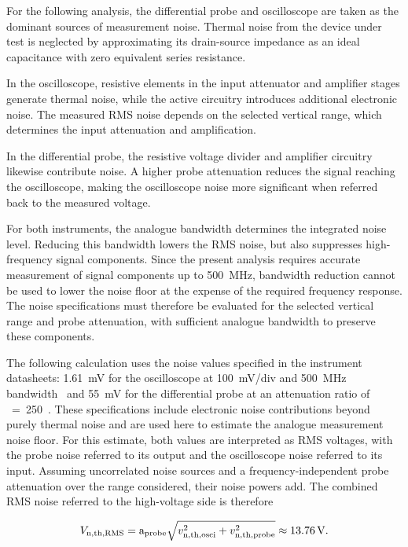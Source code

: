 For the following analysis, the differential probe and oscilloscope are taken as the dominant sources of measurement noise.
Thermal noise from the device under test is neglected by approximating its drain-source impedance as an ideal capacitance with zero equivalent series resistance.

In the oscilloscope, resistive elements in the input attenuator and amplifier stages generate thermal noise, while the active circuitry introduces additional electronic noise.
The measured RMS noise depends on the selected vertical range, which determines the input attenuation and amplification.

In the differential probe, the resistive voltage divider and amplifier circuitry likewise contribute noise.
A higher probe attenuation reduces the signal reaching the oscilloscope, making the oscilloscope noise more significant when referred back to the measured voltage.

For both instruments, the analogue bandwidth determines the integrated noise level.
Reducing this bandwidth lowers the RMS noise, but also suppresses high-frequency signal components.
Since the present analysis requires accurate measurement of signal components up to \SI{500}{MHz}, bandwidth reduction cannot be used to lower the noise floor at the expense of the required frequency response.
The noise specifications must therefore be evaluated for the selected vertical range and probe attenuation, with sufficient analogue bandwidth to preserve these components.

The following calculation uses the noise values specified in the instrument datasheets: \SI{1.61}{mV} for the oscilloscope at \SI{100}{mV/div} and \SI{500}{MHz} bandwidth~\cite{tektronix_mso_2026} and \SI{55}{mV} for the differential probe at an attenuation ratio of ~=~250~\cite{pmk_gmbh_datasheet_2017}.
These specifications include electronic noise contributions beyond purely thermal noise and are used here to estimate the analogue measurement noise floor.
For this estimate, both values are interpreted as RMS voltages, with the probe noise referred to its output and the oscilloscope noise referred to its input.
Assuming uncorrelated noise sources and a frequency-independent probe attenuation over the range considered, their noise powers add.
The combined RMS noise referred to the high-voltage side is therefore

\begin{equation}
	{V}_{\mathrm{n,th,RMS}} = \text{a}_{\text{probe}}\sqrt{{v}_{\mathrm{n,th,osci}}^2 + {v}_{\mathrm{n,th,probe}}^2}
	\approx \SI{13.76}{V}.
\end{equation}

